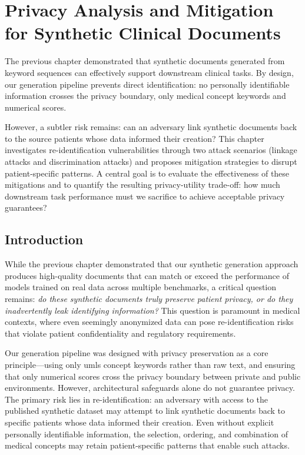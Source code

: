 \chapter{Privacy Analysis and Mitigation for Synthetic Clinical Documents}
\label{chap:privacy}

The previous chapter demonstrated that synthetic documents generated from keyword sequences can effectively support downstream clinical tasks.
By design, our generation pipeline prevents direct identification: no personally identifiable information crosses the privacy boundary, only medical concept keywords and numerical scores.

However, a subtler risk remains: can an adversary link synthetic documents back to the source patients whose data informed their creation?
This chapter investigates re-identification vulnerabilities through two attack scenarios (linkage attacks and discrimination attacks) and proposes mitigation strategies to disrupt patient-specific patterns.
A central goal is to evaluate the effectiveness of these mitigations and to quantify the resulting privacy-utility trade-off: how much downstream task performance must we sacrifice to achieve acceptable privacy guarantees?

\clearpage
\minitoc

\section{Introduction}

While the previous chapter demonstrated that our synthetic generation approach produces high-quality documents that can match or exceed the performance of models trained on real data across multiple benchmarks, a critical question remains: \textit{do these synthetic documents truly preserve patient privacy, or do they inadvertently leak identifying information?} This question is paramount in medical contexts, where even seemingly anonymized data can pose re-identification risks that violate patient confidentiality and regulatory requirements.

Our generation pipeline was designed with privacy preservation as a core principle—using only \gls{umls} concept keywords rather than raw text, and ensuring that only numerical scores cross the privacy boundary between private and public environments. However, architectural safeguards alone do not guarantee privacy. The primary risk lies in re-identification: an adversary with access to the published synthetic dataset may attempt to link synthetic documents back to specific patients whose data informed their creation. Even without explicit personally identifiable information, the selection, ordering, and combination of medical concepts may retain patient-specific patterns that enable such attacks.


